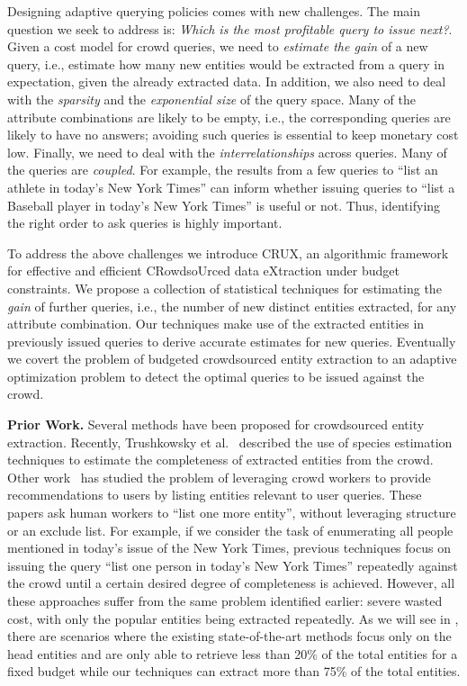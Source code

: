 Designing adaptive querying policies comes with new challenges. The main question we seek to address is: {\em Which is the most profitable query to issue next?}. Given a cost model for crowd queries, we need to {\em estimate the gain} of a new query, i.e., estimate how many new entities would be extracted from a query in expectation, given the already extracted data. In addition, we also need to deal with the {\em sparsity} and the {\em exponential size} of the query space. Many of the attribute combinations are likely to be empty, i.e., the corresponding queries are likely to have no answers; avoiding such queries is essential to keep monetary cost low. Finally, we need to deal with the {\em interrelationships} across queries. Many of the queries are {\em coupled}. For example, the results from a few queries to ``list an athlete in today's New York Times'' can inform whether issuing queries to ``list a Baseball player in today's New York Times'' is useful or not.  Thus, identifying the right order to ask queries is highly important.

To address the above challenges we introduce CRUX, an algorithmic framework for effective and efficient CRowdsoUrced data eXtraction under budget constraints. We propose a collection of  statistical techniques for estimating the {\em gain} of further queries, i.e., the number of new distinct entities extracted, for any attribute combination. Our techniques make use of the extracted entities in previously issued queries to derive accurate estimates for new queries. Eventually we covert the problem of budgeted crowdsourced entity extraction to an adaptive optimization problem to detect the optimal queries to be issued against the crowd.

\noindent
{\bf Prior Work.} Several methods have been proposed for crowdsourced entity extraction. Recently, Trushkowsky et al.~\cite{trushkowsky:2013}
described the use of species estimation techniques to estimate the completeness of extracted entities from the crowd. 
Other work~\cite{amsterdamer:2014} has studied the problem of leveraging crowd workers to provide recommendations to users by listing entities relevant to user queries. These papers ask human workers to ``list one more entity'', without leveraging structure or an exclude list. For example, if we consider the task of enumerating all people mentioned in today's issue of the New York Times, previous techniques focus on issuing the query ``list one person in today's New York Times'' repeatedly against the crowd until a certain desired degree of completeness is achieved.
However, all these approaches suffer from the same problem identified earlier: severe wasted cost,
with only the popular entities being extracted repeatedly. As we will see in , there are scenarios where the existing state-of-the-art methods focus only on the head entities and are only able to retrieve less than 20\% of the total entities for a fixed budget while our techniques can extract more than 75\% of the total entities.


